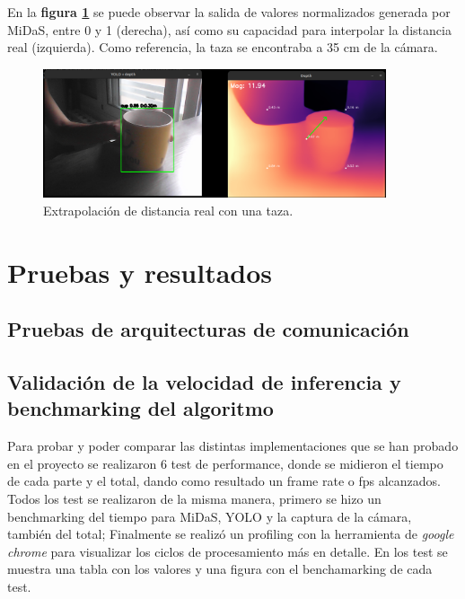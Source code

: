 En la \textbf{figura \ref{fig:taza_extrapolacion}} se puede observar la salida de valores normalizados generada por MiDaS, entre 0 y 1 (derecha), así como su capacidad para interpolar la distancia real (izquierda). Como referencia, la taza se encontraba a 35 cm de la cámara.



\begin{figure}[h]
    \centering
    \includegraphics[width=0.9\textwidth]{images/extrapolacion_taza.png}
    \caption{Extrapolación de distancia real con una taza.}
    \label{fig:taza_extrapolacion}
\end{figure}



  \chapter{Pruebas y resultados}
    \section{Pruebas de arquitecturas de comunicación}
    \section{Validación de la velocidad de inferencia y benchmarking del algoritmo}
Para probar y poder comparar las distintas implementaciones que se han probado en el proyecto se realizaron 6 test de performance, donde se midieron el tiempo de cada parte y el total, dando como resultado un frame rate o fps alcanzados. Todos los test se realizaron de la misma manera, primero se hizo un benchmarking del tiempo para MiDaS, YOLO y la captura de la cámara, también del total; Finalmente se realizó un profiling con la herramienta de \textit{google chrome} para visualizar los ciclos de procesamiento más en detalle. En los test se muestra una tabla con los valores y una figura con el benchamarking de cada test. 

